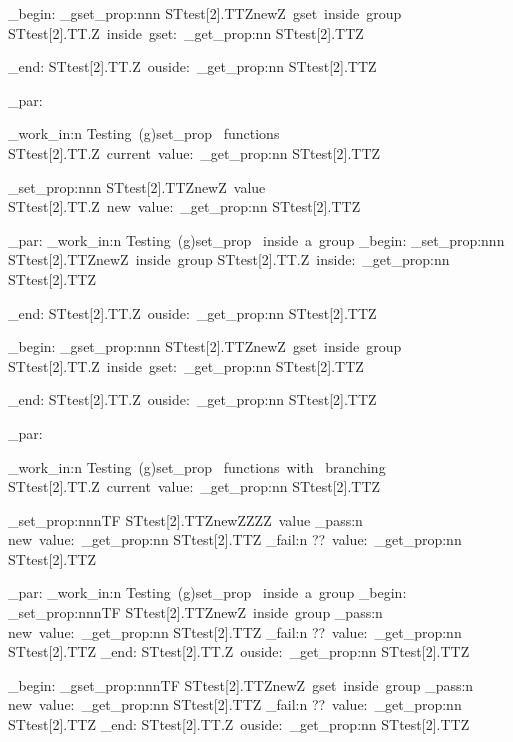 \documentclass{article}
\begin{document}
\group_begin:
  \starray_gset_prop:nnn {STtest[2].TT}{Z}{newZ~gset~inside~group}
  STtest[2].TT.Z~inside~gset:~\starray_get_prop:nn {STtest[2].TT}{Z}\par
\group_end:
  STtest[2].TT.Z~ouside:~\starray_get_prop:nn {STtest[2].TT}{Z}\par

\sttests_par:

\sttests_work_in:n {Testing~(g)set_prop ~functions}
STtest[2].TT.Z~current~value:~\starray_get_prop:nn {STtest[2].TT}{Z}\par
\starray_set_prop:nnn {STtest[2].TT}{Z}{newZ~value}
STtest[2].TT.Z~new~value:~\starray_get_prop:nn {STtest[2].TT}{Z}\par


\sttests_par:
\sttests_work_in:n {Testing~(g)set_prop ~inside~a~group}
\group_begin:
  \starray_set_prop:nnn {STtest[2].TT}{Z}{newZ~inside~group}
  STtest[2].TT.Z~inside:~\starray_get_prop:nn {STtest[2].TT}{Z}\par
\group_end:
  STtest[2].TT.Z~ouside:~\starray_get_prop:nn {STtest[2].TT}{Z}\par

\group_begin:
  \starray_gset_prop:nnn {STtest[2].TT}{Z}{newZ~gset~inside~group}
  STtest[2].TT.Z~inside~gset:~\starray_get_prop:nn {STtest[2].TT}{Z}\par
\group_end:
  STtest[2].TT.Z~ouside:~\starray_get_prop:nn {STtest[2].TT}{Z}\par

\sttests_par:

\sttests_work_in:n {Testing~(g)set_prop ~functions~with ~branching}
STtest[2].TT.Z~current~value:~\starray_get_prop:nn {STtest[2].TT}{Z}\par

\starray_set_prop:nnnTF {STtest[2].TT}{Z}{newZZZZ~value}
  {\sttests_pass:n {new~value:~\starray_get_prop:nn {STtest[2].TT}{Z}}}
  {\sttests_fail:n {??~value:~\starray_get_prop:nn {STtest[2].TT}{Z}}}

\sttests_par:
\sttests_work_in:n {Testing~(g)set_prop ~inside~a~group}
\group_begin:
  \starray_set_prop:nnnTF {STtest[2].TT}{Z}{newZ~inside~group}
    {\sttests_pass:n {new~value:~\starray_get_prop:nn {STtest[2].TT}{Z}}}
    {\sttests_fail:n {??~value:~\starray_get_prop:nn {STtest[2].TT}{Z}}}
\group_end:
  STtest[2].TT.Z~ouside:~\starray_get_prop:nn {STtest[2].TT}{Z}\par

\group_begin:
  \starray_gset_prop:nnnTF {STtest[2].TT}{Z}{newZ~gset~inside~group}
    {\sttests_pass:n {new~value:~\starray_get_prop:nn {STtest[2].TT}{Z}}}
    {\sttests_fail:n {??~value:~\starray_get_prop:nn {STtest[2].TT}{Z}}}
\group_end:
  STtest[2].TT.Z~ouside:~\starray_get_prop:nn {STtest[2].TT}{Z}\par
\end{document}
